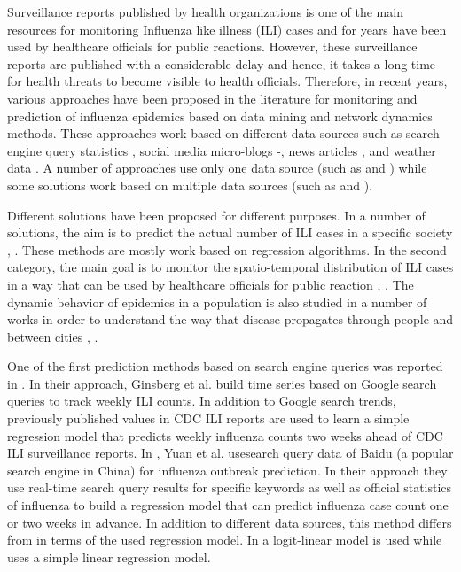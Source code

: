 Surveillance reports published by health organizations is one of the
main resources for monitoring Influenza like illness (ILI) cases and for
years have been used by healthcare officials for public reactions.
However, these surveillance reports are published with a considerable
delay and hence, it takes a long time for health threats to become
visible to health officials. Therefore, in recent years, various
approaches have been proposed in the literature for monitoring and
prediction of influenza epidemics based on data mining and network
dynamics methods. These approaches work based on different data sources
such as search engine query statistics \cite{ref1}\cite{ref2}, social
media micro-blogs \cite{ref3}-\cite{ref7}, news articles \cite{ref8},
and weather data \cite{ref9}. A number of approaches use only one data
source (such as \cite{ref1} and \cite{ref4}) while some solutions work
based on multiple data sources (such as \cite{ref3} and \cite{ref10}). 

Different solutions have been proposed for different purposes. In a
number of solutions, the aim is to predict the actual number of ILI
cases in a specific society \cite{ref2}, \cite{ref1}. These methods are
mostly work based on regression algorithms. In the second category, the
main goal is to monitor the spatio-temporal distribution of ILI cases in
a way that can be used by healthcare officials for public reaction
\cite{ref3}, \cite{ref4}. The dynamic behavior of epidemics in a
population is also studied in a number of works in order to understand
the way that disease propagates through people and between cities
\cite{ref8}, \cite{ref11}.

One of the first prediction methods based on search engine queries was
reported in \cite{ref2}. In their approach, Ginsberg et al. build time
series based on Google search queries to track weekly ILI counts. In
addition to Google search trends, previously published values in CDC ILI
reports are used to learn a simple regression model that predicts weekly
influenza counts two weeks ahead of CDC ILI surveillance reports. In
\cite{ref1}, Yuan et al. usesearch query data of Baidu (a popular search
engine in China) for influenza outbreak prediction. In their approach
they use real-time search query results for specific keywords as well as
official statistics of influenza to build a regression model that can
predict influenza case count one or two weeks in advance. In addition to
different data sources, this method differs from \cite{ref2} in terms of
the used regression model. In \cite{ref2} a logit-linear model is used
while \cite{ref1} uses a simple linear regression model.

